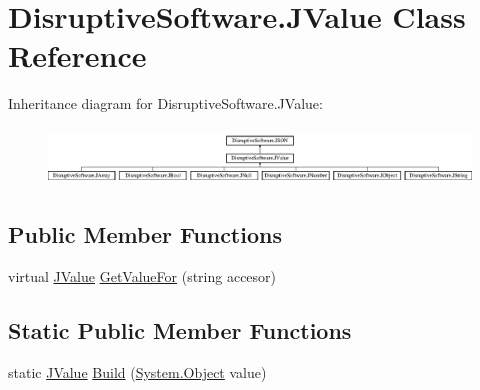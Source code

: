 \hypertarget{class_disruptive_software_1_1_j_value}{\section{Disruptive\+Software.\+J\+Value Class Reference}
\label{class_disruptive_software_1_1_j_value}
}
Inheritance diagram for Disruptive\+Software.\+J\+Value\+:\begin{figure}[H]
\begin{center}
\leavevmode
\includegraphics[height=1.538462cm]{class_disruptive_software_1_1_j_value}
\end{center}
\end{figure}
\subsection*{Public Member Functions}
\begin{DoxyCompactItemize}
\item 
virtual \hyperlink{class_disruptive_software_1_1_j_value}{J\+Value} \hyperlink{class_disruptive_software_1_1_j_value_a67715e7bcb3d6193983a9e7cdb293bac}{Get\+Value\+For} (string accesor)
\end{DoxyCompactItemize}
\subsection*{Static Public Member Functions}
\begin{DoxyCompactItemize}
\item 
static \hyperlink{class_disruptive_software_1_1_j_value}{J\+Value} \hyperlink{class_disruptive_software_1_1_j_value_a1e484cb641b22fd2d2f02e678897b114}{Build} (\hyperlink{i_c_s___logic_8cs_a5b2c8b05b9a357906d7f9e5b2c1e154d}{System.\+Object} value)
\end{DoxyCompactItemize}
